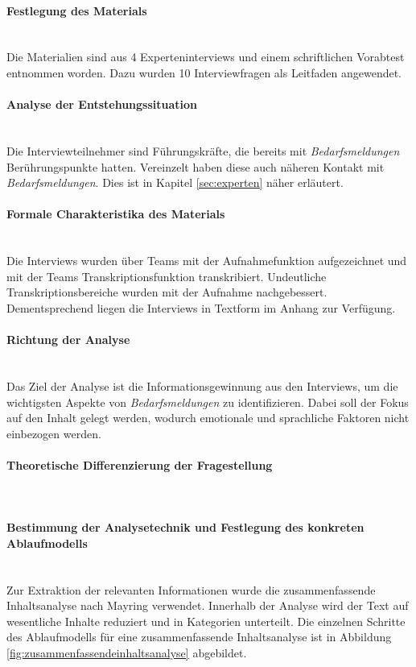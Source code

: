 \paragraph{Festlegung des Materials}\mbox{} \\
Die Materialien sind aus 4 Experteninterviews und einem schriftlichen Vorabtest entnommen worden. Dazu wurden 10 Interviewfragen als Leitfaden angewendet.
\paragraph{Analyse der Entstehungssituation}\mbox{} \\
Die Interviewteilnehmer sind Führungskräfte, die bereits mit \emph{Bedarfsmeldungen} Berührungspunkte hatten. Vereinzelt haben diese auch näheren Kontakt mit \emph{Bedarfsmeldungen}. Dies ist in Kapitel \ref{sec:experten} näher erläutert.
\paragraph{Formale Charakteristika des Materials}\mbox{} \\
Die Interviews wurden über Teams mit der Aufnahmefunktion aufgezeichnet und mit der Teams Transkriptionsfunktion transkribiert. Undeutliche Transkriptionsbereiche wurden mit der Aufnahme nachgebessert. Dementsprechend liegen die Interviews in Textform im Anhang zur Verfügung.
\paragraph{Richtung der Analyse}\mbox{} \\
Das Ziel der Analyse ist die Informationsgewinnung aus den Interviews, um die wichtigsten Aspekte von \emph{Bedarfsmeldungen} zu identifizieren. Dabei soll der Fokus auf den Inhalt gelegt werden, wodurch emotionale und sprachliche Faktoren nicht einbezogen werden.
\paragraph{Theoretische Differenzierung der Fragestellung}\mbox{} \\
\paragraph{Bestimmung der Analysetechnik und Festlegung des konkreten Ablaufmodells}\mbox{} \\
Zur Extraktion der relevanten Informationen wurde die zusammenfassende Inhaltsanalyse nach Mayring verwendet. Innerhalb der Analyse wird der Text auf wesentliche Inhalte reduziert und in Kategorien unterteilt. Die einzelnen Schritte des Ablaufmodells für eine zusammenfassende Inhaltsanalyse ist in Abbildung \ref{fig:zusammenfassendeinhaltsanalyse} abgebildet.

